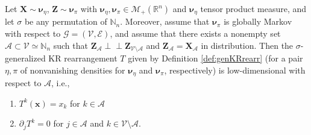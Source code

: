 \documentclass[twoside,11pt]{article}
\newcommand{\orth}{ \perp\!\!\!\perp }  %
\newcommand{\borelm}{\mathscr{M}}
\newcommand{\borelmp}{\borelm_+}
\newcommand{\genm}{\boldsymbol{\nu} }   %
\newcommand{\re}{\mathbb{R}}
\newcommand{\Vc}{\mathcal{V}}
\newcommand{\Ec}{\mathcal{E}}
\newcommand{\Ac}{\mathcal{A}}
\newcommand{\Xb}{\boldsymbol{X}}
\newcommand{\xb}{\boldsymbol{x}}
\newcommand{\Zb}{\boldsymbol{Z}}
\newcommand{\Gcb}{\boldsymbol{\mathcal{G}}}
\newcommand{\Aset}{ \Ac }
\begin{document}
\begin{lemma} \label{lem:productTarget}
Let $\Xb \sim \genm_\eta$, $\Zb \sim \genm_\pi$ with 
$\genm_\eta,\genm_\pi \in \borelmp(\re^n)$ and 
$\genm_\eta$ tensor product measure, and let
$\sigma$ be any permutation of $\mathbb{N}_n$.
%
Moreover, assume that
$\genm_\pi$ is globally Markov with respect to $\Gcb=(\Vc,\Ec)$, and
%
%
%
%
%
assume that there exists a nonempty set $\Ac \subset \Vc \simeq \mathbb{N}_n$ such that
$\Zb_{\Ac} \orth \Zb_{\Vc \setminus \Ac}$ and %
$\Zb_{\Ac} = \Xb_{\Ac}$ in distribution.
Then 
the $\sigma$-generalized KR rearrangement  $T$ given by
Definition \ref{def:genKRrearr}  (for a pair $\eta,\pi$ of nonvanishing densities for
$\genm_\eta$ and $\genm_\pi$, respectively)
%
%
is low-dimensional with respect to $\Ac$, i.e.,
%
\begin{enumerate} 
  \item  $T^k(\xb)=x_k$ for $k \in \Aset$
  \label{lem:productTarget_partI}
  \smallskip

  \item $\partial_j T^k = 0$ for $j\in \Ac$ and $k \in \Vc \setminus \Ac$.
  \label{lem:productTarget_partII}
\end{enumerate}
\end{lemma}
\end{document}
